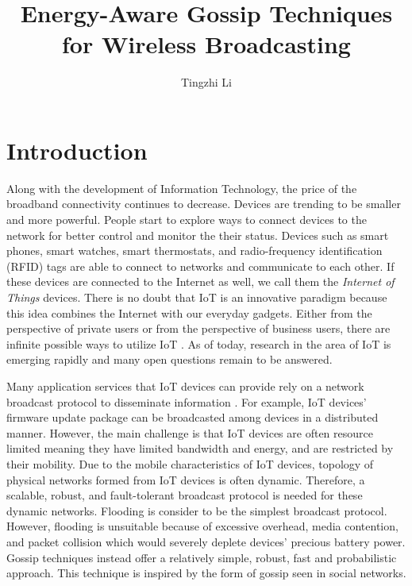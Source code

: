 \documentclass[onehalf,11pt]{beavtex}
\title{Energy-Aware Gossip Techniques for Wireless Broadcasting}
\author{Tingzhi Li}
\begin{document}
\maketitle

\mainmatter

\chapter{Introduction} \label{Chapter1}

Along with the development of Information Technology, the price of the broadband connectivity continues to decrease. Devices are trending to be smaller and more powerful. People start to explore ways to connect devices to the network for better control and monitor the their status. Devices such as smart phones, smart watches, smart thermostats, and radio-frequency identification (RFID) tags are able to connect to networks and communicate to each other. If these devices are connected to the Internet as well, we call them the \textit{Internet of Things} devices. There is no doubt that IoT is an innovative paradigm \cite{Atzori} because this idea combines the Internet with our everyday gadgets. Either from the perspective of private users or from the perspective of business users, there are infinite possible ways to utilize IoT \cite{Atzori}. As of today, research in the area of IoT is emerging rapidly and many open questions remain to be answered.

Many application services that IoT devices can provide rely on a network broadcast protocol to disseminate information \cite{smart}. For example, IoT devices' firmware update package can be broadcasted among devices in a distributed manner. However, the main challenge is that IoT devices are often resource limited meaning they have limited bandwidth and energy, and are restricted by their mobility. Due to the mobile characteristics of IoT devices, topology of physical networks formed from IoT devices is often dynamic. Therefore, a scalable, robust, and fault-tolerant broadcast protocol is needed for these dynamic networks. Flooding is consider to be the simplest broadcast protocol. However, flooding is unsuitable because of excessive overhead, media contention, and packet collision \cite{tseng2002broadcast} which would severely deplete devices' precious battery power. Gossip techniques instead offer a relatively simple, robust, fast and probabilistic approach. This technique is inspired by the form of gossip seen in social networks.
\end{document}
